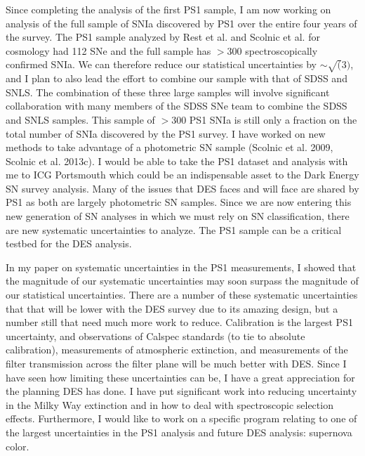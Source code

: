 \documentclass[12pt,preprint]{aastex}
\begin{document}
Since completing the analysis of the first PS1 sample, I am now working on analysis of the full sample of SNIa discovered by PS1 over the entire four years of the survey.  The PS1 sample analyzed by Rest et al. and Scolnic et al. for cosmology had 112 SNe and the full sample has $>300$ spectroscopically confirmed SNIa.  We can therefore reduce our statistical uncertainties by $\sim \sqrt(3)$, and I plan to also lead the effort to combine our sample with that of SDSS and SNLS.  The combination of these three large samples will involve significant collaboration with many members of the SDSS SNe team to combine the SDSS and SNLS samples.  This sample of $>300$ PS1 SNIa is still only a fraction on the total number of SNIa discovered by the PS1 survey.  I have worked on new methods to take advantage of a photometric SN sample (Scolnic et al. 2009, Scolnic et al. 2013c).  I would be able to take the PS1 dataset and analysis with me to ICG Portsmouth which could be an indispensable asset to the Dark Energy SN survey analysis.  Many of the issues that DES faces and will face are shared by PS1 as both are largely photometric SN samples.  Since we are now entering this new generation of SN analyses in which we must rely on SN classification, there are new systematic uncertainties to analyze.  The PS1 sample can be a critical testbed for the DES analysis.  
 
 In my paper on systematic uncertainties in the PS1 measurements, I showed that the magnitude of our systematic uncertainties may soon surpass the magnitude of our statistical uncertainties.  There are a number of these systematic uncertainties that that will be lower with the DES survey due to its amazing design, but a number still that need much more work to reduce.  Calibration is the largest PS1 uncertainty, and observations of Calspec standards (to tie to absolute calibration), measurements of atmospheric extinction, and measurements of the filter transmission across the filter plane will be much better with DES.  Since I have seen how limiting these uncertainties can be, I have a great appreciation for the planning DES has done.  I have put significant work into reducing uncertainty in the Milky Way extinction and in how to deal with spectroscopic selection effects.  Furthermore, I would like to work on a specific program relating to one of the largest uncertainties in the PS1 analysis and future DES analysis: supernova color.


\begin{comment}
\begin{figure}
\centering
\epsscale{.5}  %
\plotone{MSFigures/planckw.pdf}
\caption{The distribution for SNLS3 simulations with a conventional luminosity-variation model (top) and the `Milky Way' color-variation model.  The input ($c_{\textrm{mod}}$) distribution and observed distribution are shown for each simulation, as well as the true SNLS3 observed color distribution.  The parameters of the input distribution for each simulation are given.}
\label{fig:MLCS}
\end{figure}
\end{comment}
\end{document}
